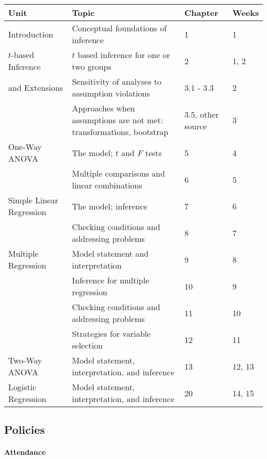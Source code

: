 \documentclass[11pt]{article}
\begin{document}
	\begin{table}[!h]
		\begin{tabular}{p{4.3cm} p{7cm} l l}
			\toprule
			Unit & Topic & Chapter & Weeks \\
			\midrule
			Introduction & Conceptual foundations of inference & 1 & 1 \\
			\midrule
			$t$-based Inference & $t$ based inference for one or two groups & 2 & 1, 2 \\
			\cmidrule(r){2-4}
			and Extensions & Sensitivity of analyses to assumption violations & 3.1 - 3.3 & 2 \\
			\cmidrule(r){2-4}
			& Approaches when assumptions are not met: transformations, bootstrap & 3.5, other source & 3 \\
			\midrule
			One-Way ANOVA & The model; $t$ and $F$ tests & 5 & 4 \\
			\cmidrule(r){2-4}
			& Multiple comparisons and linear combinations & 6 & 5 \\
			\midrule
			Simple Linear Regression & The model; inference & 7 & 6 \\
			\cmidrule(r){2-4}
			& Checking conditions and addressing problems & 8 & 7 \\
			\midrule
			Multiple Regression & Model statement and interpretation & 9 & 8 \\
			\cmidrule(r){2-4}
			& Inference for multiple regression & 10 & 9 \\
			\cmidrule(r){2-4}
			& Checking conditions and addressing problems & 11 & 10 \\
			\cmidrule(r){2-4}
			& Strategies for variable selection & 12 & 11 \\
			\midrule
			Two-Way ANOVA & Model statement, interpretation, and inference & 13 & 12, 13 \\
			\midrule
			Logistic Regression & Model statement, interpretation, and inference & 20 & 14, 15 \\
			\bottomrule
		\end{tabular}
	\end{table}
	
	\newpage
	
	\subsection*{Policies}
	
	\paragraph{Attendance}
	
\end{document}
